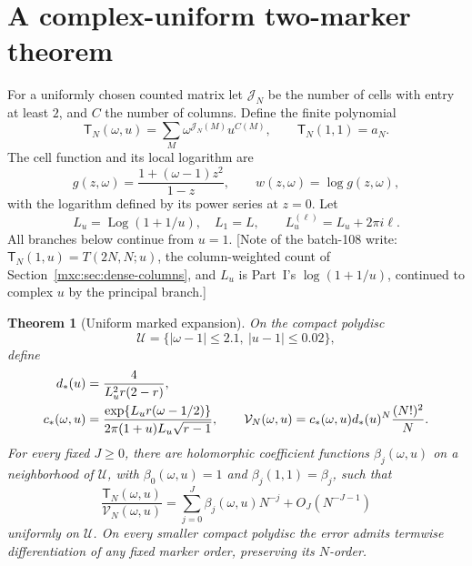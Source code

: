\documentclass[11pt]{article}
\numberwithin{equation}{section}
\newtheorem{theorem}{Theorem}[section]
\theoremstyle{definition}
\theoremstyle{remark}
\begin{document}
\section{A complex-uniform two-marker theorem}\label{mxc:pm:sec:marked}
For a uniformly chosen counted matrix let $\mathcal J_N$ be the number of cells
with entry at least $2$, and $C$ the number of columns. Define the finite
polynomial
\[
 \mathsf T_N(\omega,u)=\sum_M\omega^{\mathcal J_N(M)}u^{C(M)},\qquad
 \mathsf T_N(1,1)=a_N.
\]
The cell function and its local logarithm are
\[
 g(z,\omega)=\frac{1+(\omega-1)z^2}{1-z},\qquad w(z,\omega)=\log g(z,\omega),
\]
with the logarithm defined by its power series at $z=0$. Let
\[
 L_u=\operatorname{Log}(1+1/u),\quad L_1=L,\qquad
 L_u^{(\ell)}=L_u+2\pi i\ell.
\]
All branches below continue from $u=1$. [Note of the batch-108 write:
$\mathsf T_N(1,u)=T(2N,N;u)$, the column-weighted count of
Section~\ref{mxc:sec:dense-columns}, and $L_u$ is Part~I's $\log(1+1/u)$,
continued to complex $u$ by the principal branch.]

\begin{theorem}[Uniform marked expansion]\label{mxc:pm:thm:marked}
On the compact polydisc
\begin{equation}\label{mxc:pm:eq:polydisc}
 \mathcal U=\{|\omega-1|\le2.1,\ |u-1|\le0.02\},
\end{equation}
define
\begin{align}\label{mxc:pm:eq:markedleading}
 d_*(u)&=\frac4{L_u^2r(2-r)},\notag\\
 c_*(\omega,u)&=\frac{\exp\{L_ur(\omega-1/2)\}}
                   {2\pi(1+u)L_u\sqrt{r-1}},\qquad
 \mathcal V_N(\omega,u)=c_*(\omega,u)d_*(u)^N\frac{(N!)^2}{N}.
\end{align}
For every fixed $J\ge0$, there are holomorphic coefficient functions
$\beta_j(\omega,u)$ on a neighborhood of $\mathcal U$, with $\beta_0(\omega,u)=1$
and $\beta_j(1,1)=\beta_j$, such that
\begin{equation}\label{mxc:pm:eq:markedexpansion}
 \frac{\mathsf T_N(\omega,u)}{\mathcal V_N(\omega,u)}
   =\sum_{j=0}^J\beta_j(\omega,u)N^{-j}+O_J(N^{-J-1})
\end{equation}
uniformly on $\mathcal U$. On every smaller compact polydisc the error admits
termwise differentiation of any fixed marker order, preserving its $N$-order.
\end{theorem}
\end{document}
